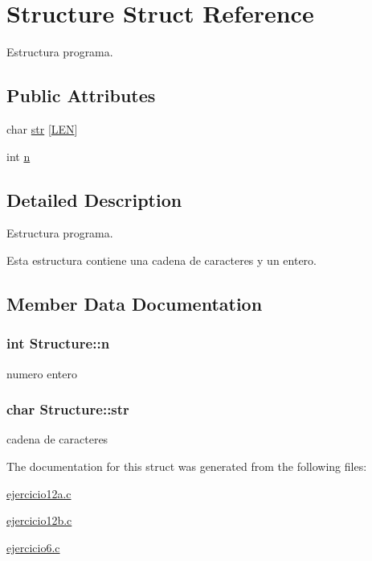 \hypertarget{structStructure}{\section{Structure Struct Reference}
\label{structStructure}
}


Estructura programa.  


\subsection*{Public Attributes}
\begin{DoxyCompactItemize}
\item 
char \hyperlink{structStructure_a2ab802cb05c7e48647ff1cca1bcfd585}{str} \mbox{[}\hyperlink{ejercicio9_8c_a05b49c662c073f89e86804f7856622a0}{L\+E\+N}\mbox{]}
\item 
int \hyperlink{structStructure_ae554951bcd1248a08201a48ce50b81c4}{n}
\end{DoxyCompactItemize}


\subsection{Detailed Description}
Estructura programa. 

Esta estructura contiene una cadena de caracteres y un entero. 

\subsection{Member Data Documentation}
\hypertarget{structStructure_ae554951bcd1248a08201a48ce50b81c4}{
\subsubsection[{n}]{\setlength{\rightskip}{0pt plus 5cm}int Structure\+::n}}\label{structStructure_ae554951bcd1248a08201a48ce50b81c4}
numero entero \hypertarget{structStructure_a2ab802cb05c7e48647ff1cca1bcfd585}{
\subsubsection[{str}]{\setlength{\rightskip}{0pt plus 5cm}char Structure\+::str}}\label{structStructure_a2ab802cb05c7e48647ff1cca1bcfd585}
cadena de caracteres 

The documentation for this struct was generated from the following files\+:\begin{DoxyCompactItemize}
\item 
\hyperlink{ejercicio12a_8c}{ejercicio12a.\+c}\item 
\hyperlink{ejercicio12b_8c}{ejercicio12b.\+c}\item 
\hyperlink{ejercicio6_8c}{ejercicio6.\+c}\end{DoxyCompactItemize}
